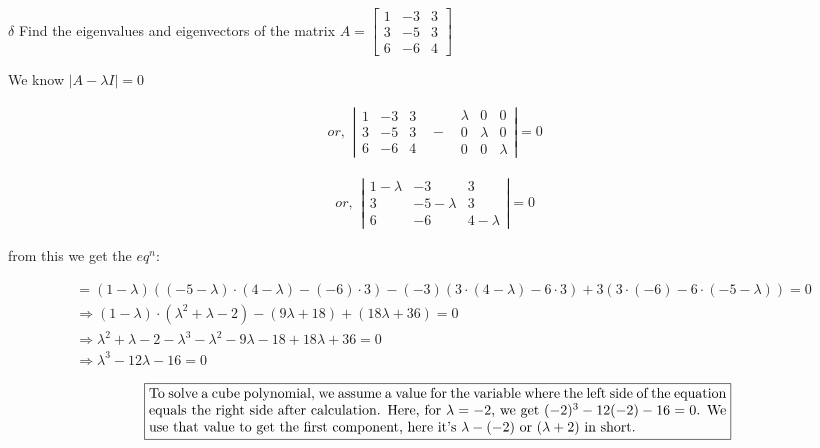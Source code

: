 \documentclass{article}
\begin{document}
\newpage

$\delta$ Find the eigenvalues and eigenvectors of the matrix \( A = \begin{bmatrix}
    1 & -3 & 3 \\
    3 & -5 & 3  \\
    6 & -6 & 4
\end{bmatrix} \)

We know \(|A - \lambda I| = 0\)


\[or, 
\begin{array}{ccc}
\left| \begin{matrix}
1 & -3 & 3 \\
3 & -5 & 3 \\
6 & -6 & 4
\end{matrix} \right. & - & \left. \begin{matrix}
\lambda & 0 & 0 \\
0 & \lambda & 0 \\
0 & 0 & \lambda
\end{matrix} \right| = 0
\end{array}
\]

\[or, 
\begin{array}{ccc}
\left| \begin{matrix}
1-\lambda & -3 & 3 \\
3 & -5-\lambda & 3 \\
6 & -6 & 4-\lambda
\end{matrix}  \right| = 0
\end{array}
\]

from this we get the $eq^n$:
    
\begin{align*}
    &= (1-\lambda)\left((-5-\lambda)\cdot(4-\lambda) - (-6)\cdot3\right) - (-3)\left(3\cdot(4-\lambda) - 6\cdot3\right) + 3 \left(3\cdot(-6) - 6\cdot(-5-\lambda)\right) = 0 \\
    &\Rightarrow (1-\lambda)\cdot(\lambda^2 + \lambda -2) - (9\lambda + 18) + (18\lambda +36) =0 \\
    &\Rightarrow \lambda^2 + \lambda - 2 -\lambda^3 - \lambda^2 - 9\lambda - 18 + 18\lambda + 36 = 0 \\
    &\Rightarrow \lambda^3 - 12\lambda - 16 = 0    
\end{align*}
 
\[
\boxed{
\begin{minipage}{01.2\textwidth}
To solve a cube polynomial, we assume a value for the variable where the left side of the equation equals the right side after calculation. Here, for $\lambda = -2$, we get $(-2)^3 - 12(-2) - 16 = 0$. We use that value to get the first component, here it's $\lambda - (-2)$ or $(\lambda + 2)$ in short.
\end{minipage}
}
\]
\end{document}
